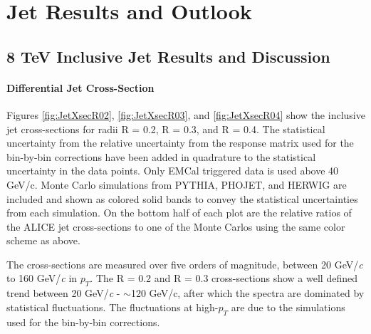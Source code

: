 \chapter{Jet Results and Outlook} \label{ch:cando}

\section{8 TeV Inclusive Jet Results and Discussion}

\subsubsection{Differential Jet Cross-Section}


\noindent
Figures \ref{fig:JetXsecR02}, \ref{fig:JetXsecR03}, and \ref{fig:JetXsecR04} show the inclusive jet cross-sections for radii R = 0.2, R = 0.3, and R = 0.4.  The statistical uncertainty from the relative uncertainty from the response matrix used for the bin-by-bin corrections have been added in quadrature to the statistical uncertainty in the data points.  Only EMCal triggered data is used above 40 GeV/c.  Monte Carlo simulations from PYTHIA, PHOJET, and HERWIG are included and shown as colored solid bands to convey the statistical uncertainties from each simulation.  On the bottom half of each plot are the relative ratios of the ALICE jet cross-sections to one of the Monte Carlos using the same color scheme as above.  

The cross-sections are measured over five orders of magnitude, between 20 GeV/\textit{c} to 160 GeV/\textit{c} in $p_{T}$. The R = 0.2 and R = 0.3 cross-sections show a well defined trend between 20 GeV/\textit{c} - $\sim$120 GeV/c, after which the spectra are dominated by statistical fluctuations.  The fluctuations at high-$p_{T}$ are due to the simulations used  for the bin-by-bin corrections.  

